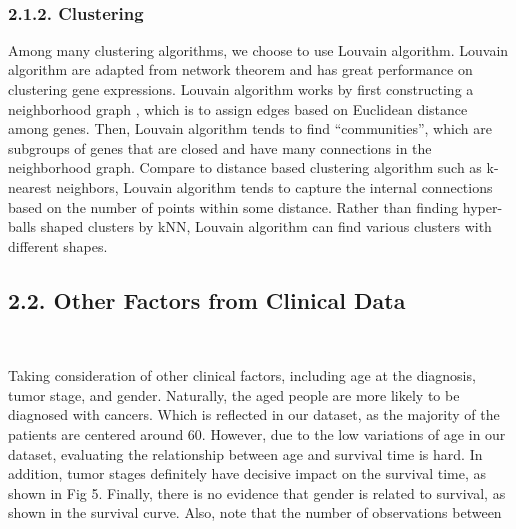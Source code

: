\documentclass[11pt]{article}
\begin{document}
    \begin{center}
    \end{center}
    { \hspace*{\fill} \\}
    
    \hypertarget{clustering}{%
\subsubsection{2.1.2. Clustering}\label{clustering}}

Among many clustering algorithms, we choose to use Louvain algorithm.
Louvain algorithm \cite{blondel2008fast} are adapted from network
theorem and has great performance on clustering gene expressions.
Louvain algorithm works by first constructing a neighborhood graph ,
which is to assign edges based on Euclidean distance among genes. Then,
Louvain algorithm tends to find ``communities'', which are subgroups of
genes that are closed and have many connections in the neighborhood
graph. Compare to distance based clustering algorithm such as k-nearest
neighbors, Louvain algorithm tends to capture the internal connections
based on the number of points within some distance. Rather than finding
hyper-balls shaped clusters by kNN, Louvain algorithm can find various
clusters with different shapes.

    \hypertarget{other-factors-from-clinical-data}{%
\subsection{2.2. Other Factors from Clinical
Data}\label{other-factors-from-clinical-data}}





    \begin{center}
    \end{center}
    { \hspace*{\fill} \\}
    
    Taking consideration of other clinical factors, including age at the
diagnosis, tumor stage, and gender. Naturally, the aged people are more
likely to be diagnosed with cancers. Which is reflected in our dataset,
as the majority of the patients are centered around 60. However, due to
the low variations of age in our dataset, evaluating the relationship
between age and survival time is hard. In addition, tumor stages
definitely have decisive impact on the survival time, as shown in Fig 5.
Finally, there is no evidence that gender is related to survival, as
shown in the survival curve. Also, note that the number of observations
between
\end{document}
